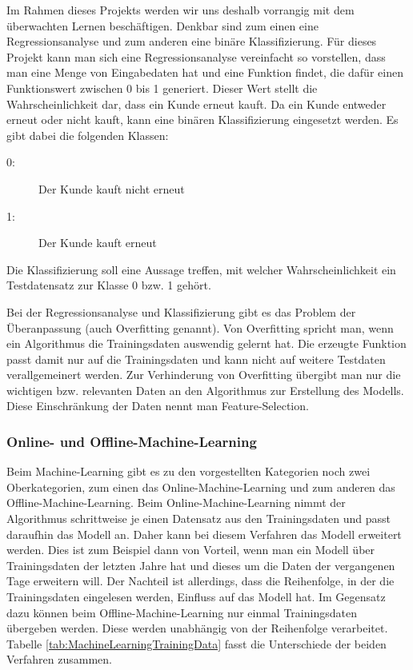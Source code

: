 Im Rahmen dieses Projekts werden wir uns deshalb vorrangig mit dem überwachten Lernen beschäftigen. 
Denkbar sind zum einen eine Regressionsanalyse und zum anderen eine binäre Klassifizierung.
Für dieses Projekt kann man sich eine Regressionsanalyse vereinfacht so vorstellen, dass man eine Menge
von Eingabedaten hat und eine Funktion findet, die dafür einen Funktionswert zwischen 0 bis 1 generiert. Dieser Wert stellt die Wahrscheinlichkeit dar, dass ein Kunde erneut kauft.
Da ein Kunde entweder erneut oder nicht kauft, kann eine binären Klassifizierung eingesetzt werden.
Es gibt dabei die folgenden Klassen:
\begin{description}
	\item[0:] Der Kunde kauft nicht erneut
	\item[1:] Der Kunde kauft erneut
\end{description}
Die Klassifizierung soll eine Aussage treffen, mit welcher Wahrscheinlichkeit ein Testdatensatz zur Klasse 0 bzw. 1 gehört.

Bei der Regressionsanalyse und Klassifizierung gibt es das Problem der Überanpassung (auch Overfitting genannt). Von Overfitting spricht man, wenn ein Algorithmus die Trainingsdaten auswendig gelernt hat.
Die erzeugte Funktion passt damit nur auf die Trainingsdaten und kann nicht auf weitere
Testdaten verallgemeinert werden. Zur Verhinderung von Overfitting übergibt man nur die wichtigen bzw. relevanten Daten an den Algorithmus zur Erstellung des Modells. Diese Einschränkung der Daten nennt man Feature-Selection.

\subsubsection{Online- und Offline-Machine-Learning}

Beim Machine-Learning gibt es zu den vorgestellten Kategorien noch zwei Oberkategorien, zum einen das 
Online-Machine-Learning und zum anderen das Offline-Machine-Learning. 
Beim Online-Machine-Learning nimmt der Algorithmus schrittweise je einen Datensatz aus den Trainingsdaten
und passt daraufhin das Modell an.
Daher kann bei diesem Verfahren das Modell erweitert werden. 
Dies ist zum Beispiel dann von Vorteil, wenn man ein Modell über Trainingsdaten der letzten Jahre hat und dieses um die Daten der vergangenen Tage erweitern will. Der Nachteil ist allerdings, dass die Reihenfolge, in der die Trainingsdaten eingelesen werden, Einfluss auf das Modell hat.
Im Gegensatz dazu können beim Offline-Machine-Learning nur einmal Trainingsdaten übergeben werden. Diese werden unabhängig von der Reihenfolge verarbeitet. Tabelle \ref{tab:MachineLearningTrainingData}
fasst die Unterschiede der beiden Verfahren zusammen.

